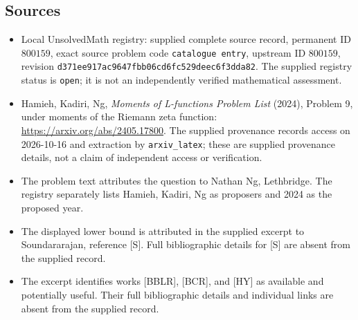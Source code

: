 \documentclass[11pt]{article}
\begin{document}
\subsection{Sources}
\begin{itemize}
\item Local UnsolvedMath registry: supplied complete source record, permanent ID \(800159\), exact source problem code \texttt{catalogue entry}, upstream ID \(800159\), revision \texttt{d371ee917ac9647fbb06cd6fc529deec6f3dda82}. The supplied registry status is \texttt{open}; it is not an independently verified mathematical assessment.
\item Hamieh, Kadiri, Ng, \emph{Moments of L-functions Problem List} (2024), Problem 9, under moments of the Riemann zeta function: \url{https://arxiv.org/abs/2405.17800}. The supplied provenance records access on 2026-10-16 and extraction by \texttt{arxiv\_latex}; these are supplied provenance details, not a claim of independent access or verification.
\item The problem text attributes the question to Nathan Ng, Lethbridge. The registry separately lists Hamieh, Kadiri, Ng as proposers and 2024 as the proposed year.
\item The displayed lower bound is attributed in the supplied excerpt to Soundararajan, reference [S]. Full bibliographic details for [S] are absent from the supplied record.
\item The excerpt identifies works [BBLR], [BCR], and [HY] as available and potentially useful. Their full bibliographic details and individual links are absent from the supplied record.
\end{itemize}
\end{document}
